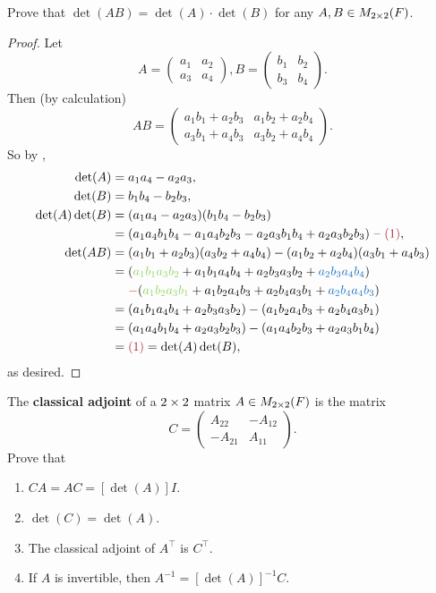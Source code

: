 \begin{exercise} \label{exercise 4.1.9}
Prove that \(\det(AB) = \det(A) \cdot \det(B)\) for any \(A, B \in M_{2 \times 2}(F)\).
\end{exercise}

\begin{proof}
Let
\[
    A = \begin{pmatrix} a_1 & a_2 \\ a_3 & a_4 \end{pmatrix},
    B = \begin{pmatrix} b_1 & b_2 \\ b_3 & b_4 \end{pmatrix}.
\]
Then (by calculation)
\[
    AB = \begin{pmatrix}
        a_1 b_1 + a_2 b_3 & a_1 b_2 + a_2 b_4 \\
        a_3 b_1 + a_4 b_3 & a_3 b_2 + a_4 b_4
    \end{pmatrix}.
\]
So by ,
\begin{align*}
    \det(A) & = a_1 a_4 - a_2 a_3, \\
    \det(B) & = b_1 b_4 - b_2 b_3, \\
    \det(A)\det(B) & = (a_1 a_4 - a_2 a_3)(b_1 b_4 - b_2 b_3) \\
                   & = (a_1 a_4 b_1 b_4 - a_1 a_4 b_2 b_3 - a_2 a_3 b_1 b_4 + a_2 a_3 b_2 b_3) \text{ -- \MAROON{(1)}}, \\
    \det(AB) & = (a_1 b_1 + a_2 b_3)(a_3 b_2 + a_4 b_4) - (a_1 b_2 + a_2 b_4)(a_3 b_1 + a_4 b_3) \\
             & = (\GREEN{a_1 b_1 a_3 b_2} + a_1 b_1 a_4 b_4 + a_2 b_3 a_3 b_2 + \BLUE{a_2 b_3 a_4 b_4}) \\
             & \ \ \ \  \RED{-} (\GREEN{a_1 b_2 a_3 b_1} + a_1 b_2 a_4 b_3 + a_2 b_4 a_3 b_1 + \BLUE{a_2 b_4 a_4 b_3}) \\
             & = (a_1 b_1 a_4 b_4 + a_2 b_3 a_3 b_2) - (a_1 b_2 a_4 b_3 + a_2 b_4 a_3 b_1) \\
             & = (a_1 a_4 b_1 b_4 + a_2 a_3 b_2 b_3) - (a_1 a_4 b_2 b_3 + a_2 a_3 b_1 b_4) \\
             & = \MAROON{(1)} = \det(A)\det(B),
\end{align*}
as desired.
\end{proof}

\begin{exercise} \label{exercise 4.1.10}
The \textbf{classical adjoint} of a \(2 \times 2\) matrix \(A \in M_{2 \times 2}(F)\) is the matrix
\[
    C = \begin{pmatrix} A_{22} & -A_{12} \\ -A_{21} & A_{11} \end{pmatrix}.
\]
Prove that
\begin{enumerate}
\item \(CA = AC = [\det(A)]I\).
\item \(\det(C) = \det(A)\).
\item The classical adjoint of \(A^\top\) is \(C^\top\).
\item If \(A\) is invertible, then \(A^{-1} = [\det(A)]^{-1}C\).
\end{enumerate}
\end{exercise}

